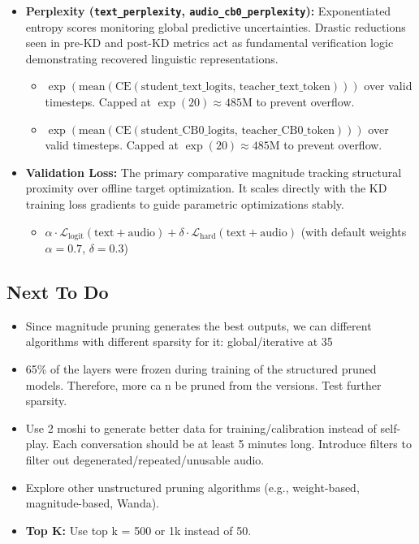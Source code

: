 \documentclass[12pt]{article}
\begin{document}
\begin{itemize}
    \item \textbf{Perplexity (\texttt{text\_perplexity}, \texttt{audio\_cb0\_perplexity}):} Exponentiated entropy scores monitoring global predictive uncertainties. Drastic reductions seen in pre-KD and post-KD metrics act as fundamental verification logic demonstrating recovered linguistic representations.
    \begin{itemize}
        \item $\exp(\text{mean}(\text{CE}(\text{student\_text\_logits, teacher\_text\_token})))$ over valid timesteps. Capped at $\exp(20) \approx 485\text{M}$ to prevent overflow.
        \item $\exp(\text{mean}(\text{CE}(\text{student\_CB0\_logits, teacher\_CB0\_token})))$ over valid timesteps. Capped at $\exp(20) \approx 485\text{M}$ to prevent overflow.
    \end{itemize}

    \item \textbf{Validation Loss:} The primary comparative magnitude tracking structural proximity over offline target optimization. It scales directly with the KD training loss gradients to guide parametric optimizations stably.
    \begin{itemize}
        \item $\alpha \cdot \mathcal{L}_{\text{logit}}(\text{text} + \text{audio}) + \delta \cdot \mathcal{L}_{\text{hard}}(\text{text} + \text{audio})$ (with default weights $\alpha=0.7$, $\delta=0.3$)
    \end{itemize}
\end{itemize}

\begin{onehalfspace}
\section{Next To Do}
\begin{itemize}
    \item Since magnitude pruning generates the best outputs, we can different algorithms with different sparsity for it: global/iterative at 35%

    \item 65\% of the layers were frozen during training of the structured pruned models. Therefore, more ca n be pruned from the versions. Test further sparsity.
    
    \item Use 2 moshi to generate better data for training/calibration instead of self-play. Each conversation should be at least 5 minutes long. Introduce filters to filter out degenerated/repeated/unusable audio.
    
    \item Explore other unstructured pruning algorithms (e.g., weight-based, magnitude-based, Wanda).
    \item \textbf{Top K:} Use top k = 500 or 1k instead of 50.
\end{itemize}
\end{onehalfspace}
\end{document}
